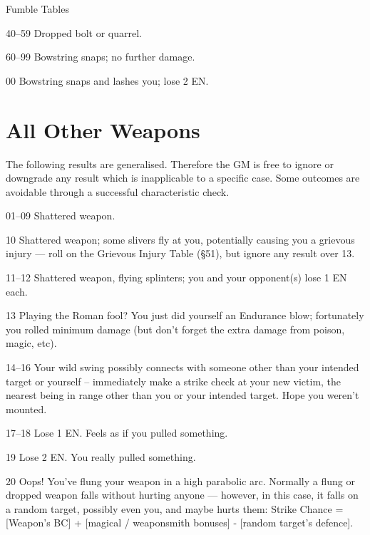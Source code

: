 \begin{Chapter}{Fumble Tables}
\begin{Description}
\item[40–59] Dropped bolt or quarrel.

\item[60–99] Bowstring snaps; no further damage.

\item[00] Bowstring snaps and lashes you; lose 2 EN.

\end{Description}

\section{All Other Weapons}

The following results are generalised.  Therefore the GM is free to
ignore or downgrade any result which is inapplicable to a specific
case.  Some outcomes are avoidable through a successful characteristic
check.

\begin{Description}
  
\item[01–09] Shattered weapon.

\item[10] Shattered weapon; some slivers fly at you, potentially
  causing you a grievous injury — roll on the Grievous Injury Table
  (§51), but ignore any result over 13.

\item[11–12] Shattered weapon, flying splinters; you and your
  opponent(s) lose 1 EN each.

\item[13] Playing the Roman fool? You just did yourself an Endurance
  blow; fortunately you rolled minimum damage (but don’t forget the
  extra damage from poison, magic, etc).

\item[14–16] Your wild swing possibly connects with someone other than
  your intended target or yourself – immediately make a strike check
  at your new victim, the nearest being in range other than you or
  your intended target.  Hope you weren’t mounted.

\item[17–18] Lose 1 EN. Feels as if you pulled something.


\item[19] Lose 2 EN. You really pulled something.

\item[20] Oops! You’ve flung your weapon in a high parabolic
  arc. Normally a flung or dropped weapon falls without hurting anyone
  — however, in this case, it falls on a random target, possibly even
  you, and maybe hurts them: Strike Chance = [Weapon’s BC] + [magical
    / weaponsmith bonuses] - [random target’s defence].


\end{Description}
\end{Chapter}
